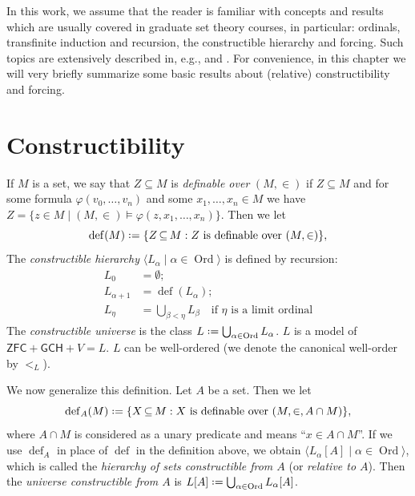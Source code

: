 \documentclass[11pt,a4paper]{report}
\theoremstyle{definition}
\theoremstyle{num.custom-title}
\theoremstyle{custom-title}
\DeclareMathOperator{\Ord}{\text{Ord}}
\DeclareMathOperator{\sse}{\subseteq}
\newcommand{\ZFC}{\ensuremath{\mathsf{ZFC}}\xspace}
\newcommand*{\defeq}{\mathrel{\rlap{%
                     \raisebox{0.3ex}{$\cdot$}}%
                     \raisebox{-0.3ex}{$\cdot$}}%
                     =}
\renewcommand{\phi}{\varphi}
\begin{document}
In this work, we assume that the reader is familiar with concepts and results which are usually covered in graduate set theory courses, in particular: ordinals, transfinite induction and recursion, the constructible hierarchy and forcing. Such topics are extensively described in, e.g., \cite{Jec2003} and \cite{Kun2013}. For convenience, in this chapter we will very briefly summarize some basic results about (relative) constructibility and forcing.

\section*{Constructibility}

If $M$ is a set, we say that $Z \sse M$ is \emph{definable over} $(M,\in)$ if $Z \sse M$ and for some formula $\phi(v_0,\ldots,v_n)$ and some $x_1,\ldots,x_n \in M$ we have $Z = \{z \in M \mid (M,\in) \models \phi(z,x_1,\ldots,x_n)\}$. Then we let 
\[
\operatorname{def} (M) \defeq \{ Z \sse M : Z \text{ is definable over } (M, \in) \},
\]
The \emph{constructible hierarchy} $\langle L_\alpha \mid \alpha \in \Ord \rangle$ is defined by recursion:
\begin{align*}
L_0 & = \emptyset;\\
L_{\alpha+1} & = \operatorname{def} (L_\alpha);\\
L_\eta & = \bigcup_{\beta < \eta} L_\beta \quad \text{if $\eta$ is a limit ordinal}
\end{align*}
%
The \emph{constructible universe} is the class $L \defeq \bigcup_{\alpha \in \Ord} L_\alpha$. $L$ is a model of $\ZFC + \mathsf{GCH} + V=L$. $L$ can be well-ordered (we denote the canonical well-order by $<_L$).

We now generalize this definition. Let $A$ be a set. Then we let
\[
\operatorname{def}_A (M) \defeq \{ X \sse M : X \text{ is definable over } (M, \in, A \cap M) \},
\]
where $A \cap M$ is considered as a unary predicate and means ``$x \in A \cap M$''. If we use $\operatorname{def}_A$ in place of $\operatorname{def}$ in the definition above, we obtain $\langle L_\alpha [A] \mid \alpha \in \Ord \rangle$, which is called the \emph{hierarchy of sets constructible from $A$} (or \emph{relative to $A$}). Then the \emph{universe constructible from $A$} is $L[A] \defeq \bigcup_{\alpha \in \Ord} L_\alpha [A]$.
\end{document}
